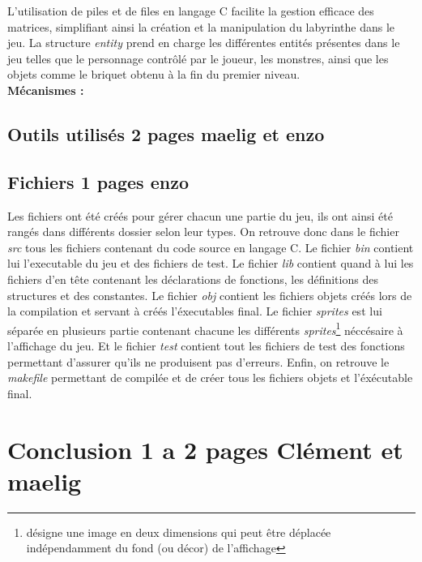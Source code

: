 \documentclass[10pt]{article}
\begin{document}
   L'utilisation de piles et de files en langage C facilite la gestion efficace des matrices, simplifiant ainsi la création et la manipulation du 
   labyrinthe dans le jeu. La structure \textit{entity} prend en charge les différentes entités présentes dans le jeu telles que le personnage contrôlé 
   par le joueur, les monstres, ainsi que les objets comme le briquet obtenu à la fin du premier niveau.\\


   \textbf{Mécanismes :}\\
   \subsection{Outils utilisés 2 pages maelig et enzo}
   \subsection{Fichiers 1 pages enzo}

   Les fichiers ont été créés pour gérer chacun une partie du jeu, ils ont ainsi été rangés dans différents dossier selon leur types. On retrouve donc dans le fichier \textit{src} tous les fichiers contenant du code source en langage C. Le fichier \textit{bin} contient lui l'executable du jeu et des fichiers de test. Le fichier \textit{lib} contient quand à lui les fichiers d'en tête contenant les déclarations de fonctions, les définitions des structures et des constantes.
   Le fichier \textit{obj} contient les fichiers objets créés lors de la compilation et servant à créés l'éxecutables final.
   Le fichier \textit{sprites} est lui séparée en plusieurs partie contenant chacune les différents \textit{sprites}\footnote{
   désigne une image en deux dimensions qui peut être déplacée indépendamment du fond (ou décor) de l'affichage} néccésaire à l'affichage du jeu. Et le fichier \textit{test} contient tout les fichiers de test des fonctions permettant d'assurer qu'ils ne produisent pas d'erreurs. Enfin, on retrouve le \textit{makefile} permettant de compilée et de créer tous les fichiers objets et l'éxécutable final.
   
\section{Conclusion 1 a 2 pages Clément et maelig}
\end{document}
